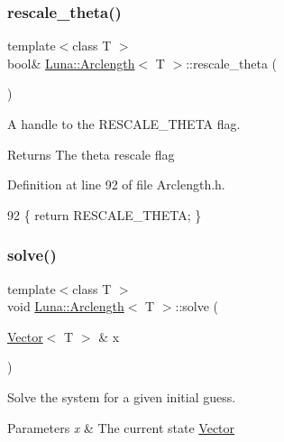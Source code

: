 \subsubsection{\texorpdfstring{rescale\+\_\+theta()}{rescale\_theta()}}
{\footnotesize\ttfamily template$<$class T $>$ \\
bool\& \hyperlink{classLuna_1_1Arclength}{Luna\+::\+Arclength}$<$ T $>$\+::rescale\+\_\+theta (\begin{DoxyParamCaption}{ }\end{DoxyParamCaption})\hspace{0.3cm}{\ttfamily [inline]}}



A handle to the R\+E\+S\+C\+A\+L\+E\+\_\+\+T\+H\+E\+TA flag. 

\begin{DoxyReturn}{Returns}
The theta rescale flag 
\end{DoxyReturn}


Definition at line 92 of file Arclength.\+h.


\begin{DoxyCode}
92 \{ \textcolor{keywordflow}{return} RESCALE\_THETA; \}
\end{DoxyCode}
\mbox{\label{classLuna_1_1Arclength_a0829d51bb49011f5ed56c25b7554d115}} 
\subsubsection{\texorpdfstring{solve()}{solve()}}
{\footnotesize\ttfamily template$<$class T $>$ \\
void \hyperlink{classLuna_1_1Arclength}{Luna\+::\+Arclength}$<$ T $>$\+::solve (\begin{DoxyParamCaption}\item[{\hyperlink{classLuna_1_1Vector}{Vector}$<$ T $>$ \&}]{x }\end{DoxyParamCaption})\hspace{0.3cm}{\ttfamily [pure virtual]}}



Solve the system for a given initial guess. 


\begin{DoxyParams}{Parameters}
{\em x} & The current state \hyperlink{classLuna_1_1Vector}{Vector} \\
\hline
\end{DoxyParams}


